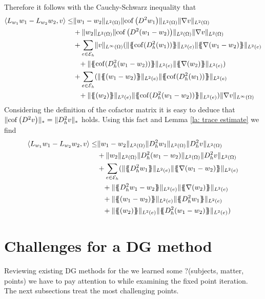 Therefore it follows with the Cauchy-Schwarz inequality that
\begin{align}
\bilin{L_{w_1}w_1-L_{w_2}w_2} v \leq &  \LTwonorm{w_1-w_2} \LTwonorm{\cofHess{w_1}} \LTwonorm{\nabla v} \nonumber\\
			&+ \LTwonorm{w_2} \LTwonorm{\cofHess{(w_1-w_2)}} \LTwonorm{\nabla{v}} \nonumber \\
		&+ \sum_{e \in \edges} 
			\norm{v}_{L^\infty(\Omega)}( %
				\LTwonormE{ \average{ \cof(D_h^2 (w_1))}} \LTwonormE{ \average{\nabla (w_1-w_2)}} \nonumber\\
			  &\phantom++\LTwonormE{ \average{ \cof(D_h^2 (w_1-w_2))}} \LTwonormE{ \average{\nabla (w_2)}} 
			) \nonumber \\%
		&+ \sum_{e \in \edges} 
			( %
				\LTwonormE{ \average{(w_1-w_2)}} \LTwonormE{ \average{ \cof(D_h^2 (w_1))}} \nonumber\\
				&\phantom++\LTwonormE{ \average{(w_2)}} \LTwonormE{ \average{ \cof(D_h^2 (w_1-w_2))}} 
		) \norm{\nabla v}_{L^\infty(\Omega)}%
\end{align}
Considering the definition of the cofactor matrix it is easy to deduce that $\lVert \operatorname{cof} \left( D^2 v \right) \rVert_* =\lVert D^2_h{v} \rVert_*$ holds.
Using this fact and Lemma \ref{la: trace estimate} we find
\begin{align}
\bilin{L_{w_1}w_1-L_{w_2}w_2} v \leq & %
\LTwonorm{w_1-w_2} \LTwonorm{\hess{w_1}} \LTwonorm{\hess{v}} \nonumber\\
&+ \LTwonorm{w_2} \LTwonorm{\hess{(w_1-w_2)}} \LTwonorm{\hess{v}} \nonumber \\
	&+ \sum_{e \in \edges} (
		\LTwonormE{ \average{ \hess{w_1 }}} \LTwonormE{ \average{\nabla (w_1-w_2)}} \nonumber\\
		&\phantom+ +\LTwonormE{ \average{ \hess{w_1-w_2}}} \LTwonormE{ \average{\nabla (w_2)}}  \nonumber \\%
		&\phantom+ +\LTwonormE{ \average{(w_1-w_2)}} \LTwonormE{ \average{ \hess{w_1}}} \nonumber\\
		&\phantom+ +\LTwonormE{ \average{(w_2)}} \LTwonormE{ \average{ D_h^2 (w_1-w_2)}} 
	)
\end{align}


\section{Challenges for a \MA DG method}
Reviewing existing DG methods for the \MA we learned some ?(subjects, matter, points) we have to pay attention to  while examining the fixed point iteration. The next subsections treat the most challenging points.

